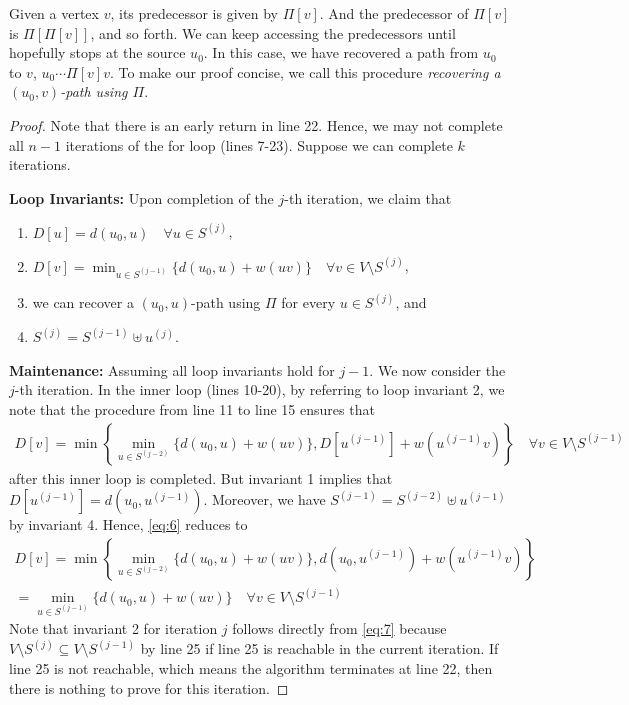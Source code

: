 \documentclass[thmcnt=section, 12pt, color=cyan]{my-elegantbook}
\begin{document}
Given a vertex $v$, its predecessor is given by $\Pi[v]$. And the predecessor of $\Pi[v]$ is $\Pi[ \Pi[v] ]$, and so forth. We can keep accessing the predecessors until hopefully stops at the source $u_0$. In this case, we have recovered a path from $u_0$ to $v$, $u_0 \cdots \Pi[v] v$. To make our proof concise, we call this procedure \textit{recovering a $(u_0, v)$-path using $\Pi$}.

\begin{proof}
    Note that there is an early return in line 22. Hence, we may not complete all $n-1$ iterations of the for loop (lines 7-23). Suppose we can complete $k$ iterations. 

    \noindent\textbf{Loop Invariants:} Upon completion of the $j$-th iteration, we claim that 
    \begin{enumerate}
        \item $D[u] = d(u_0, u) \quad \forall u \in S^{(j)}$,
        \item $D[v] = \min_{u \in S^{(j-1)}} \{ d(u_0, u) + w(u v) \} \quad \forall v \in V \setminus S^{(j)}$,
        \item we can recover a $(u_0, u)$-path using $\Pi$ for every $u \in S^{(j)}$, and 
        \item $S^{(j)} = S^{(j-1)} \uplus u^{(j)}$. 
    \end{enumerate}

    \noindent\textbf{Maintenance:} Assuming all loop invariants hold for $j-1$. We now consider the $j$-th iteration. In the inner loop (lines 10-20), by referring to loop invariant 2, we note that the procedure from line 11 to line 15 ensures that 
    \begin{align}
        D[v] = \min \left\{
            \min_{u \in S^{(j-2)}} \{ d(u_0, u) + w(u v) \},
            D[u^{(j-1)}] + w(u^{(j-1)} v)
        \right\}
        \quad \forall v \in V \setminus S^{(j-1)}
        \label{eq:6}
    \end{align}
    after this inner loop is completed. But invariant 1 implies that $D[u^{(j-1)}] = d(u_0, u^{(j-1)})$. Moreover, we have $S^{(j-1)} = S^{(j-2)} \uplus u^{(j-1)}$ by invariant 4. Hence, \eqref{eq:6} reduces to 
    \begin{multline}
        D[v] = \min \left\{
            \min_{u \in S^{(j-2)}} \{ d(u_0, u) + w(u v) \},
            d(u_0, u^{(j-1)}) + w(u^{(j-1)} v)
        \right\} \\
        = \min_{u \in S^{(j-1)}} \{ d(u_0, u) + w(u v) \}
        \quad \forall v \in V \setminus S^{(j-1)}
        \label{eq:7}
    \end{multline}
    Note that invariant 2 for iteration $j$ follows directly from \eqref{eq:7} because $V \setminus S^{(j)} \subseteq V \setminus S^{(j-1)}$ by line 25 if line 25 is reachable in the current iteration. If line 25 is not reachable, which means the algorithm terminates at line 22, then there is nothing to prove for this iteration.


\end{proof}
\end{document}
